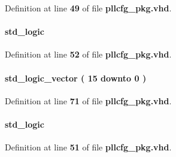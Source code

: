 Definition at line {\bf 49} of file {\bf pllcfg\+\_\+pkg.\+vhd}.

\paragraph[{c3\+\_\+byp}]{ {\bfseries \textcolor{comment}{std\+\_\+logic}\textcolor{vhdlchar}{ }} \hspace{0.3cm}{\ttfamily [Record]}}\label{classpllcfg__pkg_a17d6a97cbe261d0f54f0fc4d23254f95}


Definition at line {\bf 52} of file {\bf pllcfg\+\_\+pkg.\+vhd}.

\paragraph[{c3\+\_\+cnt}]{ {\bfseries \textcolor{comment}{std\+\_\+logic\+\_\+vector}\textcolor{vhdlchar}{ }\textcolor{vhdlchar}{(}\textcolor{vhdlchar}{ }\textcolor{vhdlchar}{ } \textcolor{vhdldigit}{15} \textcolor{vhdlchar}{ }\textcolor{keywordflow}{downto}\textcolor{vhdlchar}{ }\textcolor{vhdlchar}{ } \textcolor{vhdldigit}{0} \textcolor{vhdlchar}{ }\textcolor{vhdlchar}{)}\textcolor{vhdlchar}{ }} \hspace{0.3cm}{\ttfamily [Record]}}\label{classpllcfg__pkg_a9c67421001e0b76731772935cf995209}


Definition at line {\bf 71} of file {\bf pllcfg\+\_\+pkg.\+vhd}.

\paragraph[{c3\+\_\+odddiv}]{ {\bfseries \textcolor{comment}{std\+\_\+logic}\textcolor{vhdlchar}{ }} \hspace{0.3cm}{\ttfamily [Record]}}\label{classpllcfg__pkg_a2ab4bd5b63f8176ef8007016d42f81d6}


Definition at line {\bf 51} of file {\bf pllcfg\+\_\+pkg.\+vhd}.

